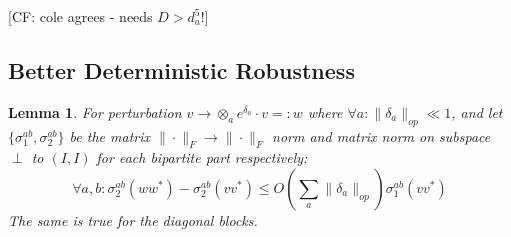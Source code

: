 \documentclass{article}
\newtheorem{lemma}[theorem]{Lemma}
\newcommand{\CF}[1]{{\color{purple}[CF: #1]}}
\begin{document}
\CF{cole agrees - needs $D > d_a^5!$}

\subsection{Better Deterministic Robustness}
\begin{lemma}\label{lem:block-perturbation-appendix}
For perturbation $v \to \otimes_{a} e^{\delta_{a}} \cdot v =: w$ where $\forall a: \|\delta_{a}\|_{op} \ll 1$, and let $\{\sigma_{1}^{ab}, \sigma_{2}^{ab}\}$ be the matrix $\|\cdot\|_{F} \to \|\cdot\|_{F}$ norm and matrix norm on subspace $\perp$ to $(I,I)$ for each bipartite part respectively:
\[ \forall a,b: \sigma_{2}^{ab}(w w^{*}) - \sigma_{2}^{ab}(v v^{*}) \leq O \left( \sum_{a} \|\delta_{a}\|_{op}  \right) \sigma_{1}^{ab}(v v^{*})   \]
The same is true for the diagonal blocks. 
\end{lemma}
\end{document}
